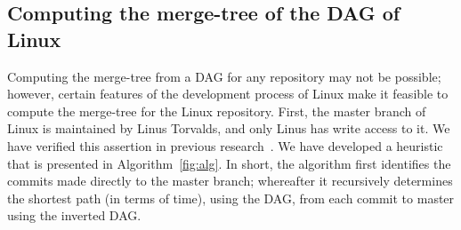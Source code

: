 \documentclass[conference, draftclsnofoot, draft]{IEEEtran}
\begin{document}
\subsection{Computing the merge-tree of the DAG of Linux}

Computing the merge-tree from a DAG for any repository may not be possible; however,
certain features of the development process of Linux make it feasible to compute the
merge-tree for the Linux repository. First, the master branch of Linux is maintained
by Linus Torvalds, and only Linus has write access to it. We have verified this
assertion in previous research~\cite{German2015}. We have developed a heuristic that
is presented in Algorithm~\ref{fig:alg}. In short, the algorithm first identifies
the commits made directly to the master branch; whereafter it recursively determines
the shortest path (in terms of time), using the DAG, from each commit to master
using the inverted DAG.
\end{document}
